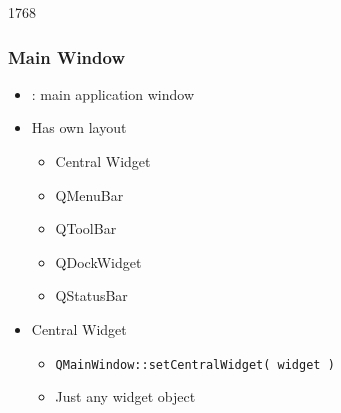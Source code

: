 \begin{slide}{1768} \frametitle{Main Window}
  \begin{itemize}
  \item {}: main application window
  \item Has own layout \\
    \begin{itemize}
    \item Central Widget
    \item QMenuBar
    \item QToolBar
    \item QDockWidget
    \item QStatusBar
   \end{itemize}
  \end{itemize}

  \vfill
  \begin{itemize}
  \item Central Widget
    \begin{itemize}
    \item \lstinline{QMainWindow::setCentralWidget( widget )}
    \item Just any widget object
    \end{itemize}
  \end{itemize}
\end{slide}

